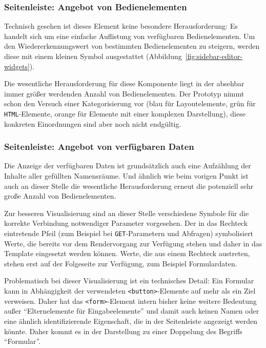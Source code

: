 \subsubsection{Seitenleiste: Angebot von Bedienelementen}

Technisch gesehen ist dieses Element keine besondere Herausforderung: Es handelt sich um eine einfache Auflistung von verfügbaren Bedienelementen. Um den Wiedererkennungswert von bestimmten Bedienelementen zu steigern, werden diese mit einem kleinen Symbol ausgestattet (Abbildung~\ref{fig:sidebar-editor-widgets}).

Die wesentliche Herausforderung für diese Komponente liegt in der absehbar immer größer werdenden Anzahl von Bedienelementen. Der Prototyp nimmt schon den Versuch einer Kategorisierung vor (blau für Layoutelemente, grün für \texttt{HTML}-Elemente, orange für Elemente mit einer komplexen Darstellung), diese konkreten Einordnungen sind aber noch nicht endgültig.

\subsubsection{Seitenleiste: Angebot von verfügbaren Daten}
\label{sec:ui-editor-sidebar-data}

Die Anzeige der verfügbaren Daten ist grundsätzlich auch eine Aufzählung der Inhalte aller gefüllten Namensräume. Und ähnlich wie beim vorigen Punkt ist auch an dieser Stelle die wesentliche Herausforderung erneut die potenziell sehr große Anzahl von Bedienelementen.

Zur besseren Visualisierung sind an dieser Stelle verschiedene Symbole für die korrekte Verbindung notwendiger Parameter vorgesehen. Der in das Rechteck eintretende Pfeil (zum Beispiel bei \texttt{GET}-Parametern und Abfragen) symbolisiert Werte, die bereits vor dem Rendervorgang zur Verfügung stehen und daher in das Template eingesetzt werden können. Werte, die aus einem Rechteck austreten, stehen erst auf der Folgeseite zur Verfügung, zum Beispiel Formulardaten.

Problematisch bei dieser Visualisierung ist ein technisches Detail: Ein Formular kann in Abhängigkeit der verwendeten \texttt{<button>}-Elemente auf mehr als ein Ziel verweisen. Daher hat das \texttt{<form>}-Element intern bisher keine weitere Bedeutung außer "`Elternelemente für Eingabeelemente"' und damit auch keinen Namen oder eine ähnlich identifizierende Eigenschaft, die in der Seitenleiste angezeigt werden könnte. Daher kommt es in der Darstellung zu einer Doppelung des Begriffs "`Formular"'.

